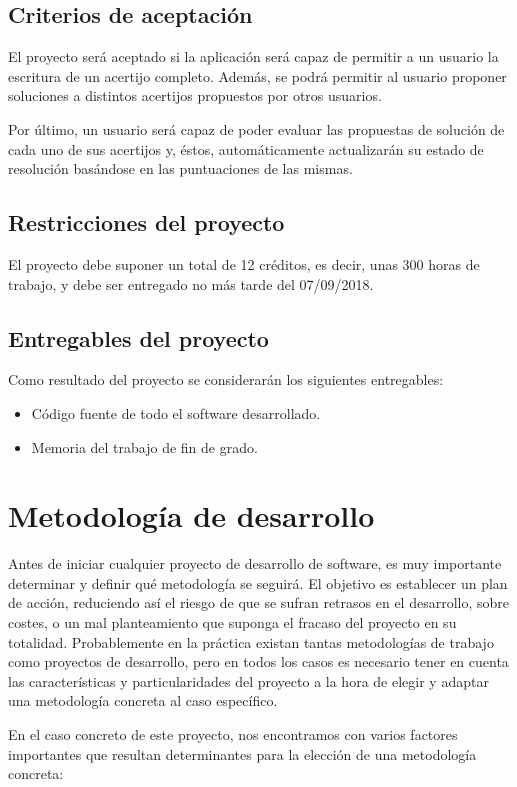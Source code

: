 \subsection{Criterios de aceptación}
El proyecto será aceptado si la aplicación será capaz de permitir a un usuario la escritura de un acertijo completo. Además, se podrá permitir al usuario proponer soluciones a distintos acertijos propuestos por otros usuarios. 

Por último, un usuario será capaz de poder evaluar las propuestas de solución de cada uno de sus acertijos y, éstos, automáticamente actualizarán su estado de resolución basándose en las puntuaciones de las mismas.
\subsection{Restricciones del proyecto}
El proyecto debe suponer un total de 12 créditos, es decir, unas 300 horas de trabajo, y debe ser entregado no más tarde del 07/09/2018.

\subsection{Entregables del proyecto}
Como resultado del proyecto se considerarán los siguientes entregables:
\begin{itemize}
    \item Código fuente de todo el software desarrollado\cite{proyectogithub}.
    \item Memoria del trabajo de fin de grado\cite{memoriagithub}.
\end{itemize}

\section{Metodología de desarrollo}
Antes de iniciar cualquier proyecto de desarrollo de software, es muy importante determinar y definir qué metodología se seguirá. El objetivo es establecer un plan de acción, reduciendo así el riesgo de que se sufran retrasos en el desarrollo, sobre costes, o un mal planteamiento que suponga el fracaso del proyecto en su totalidad. Probablemente en la práctica existan tantas metodologías de trabajo como proyectos de desarrollo, pero en todos los casos es necesario tener en cuenta las características y particularidades del proyecto a la hora de elegir y adaptar una metodología concreta al caso específico.

En el caso concreto de este proyecto, nos encontramos con varios factores importantes que resultan determinantes para la elección de una metodología concreta:

